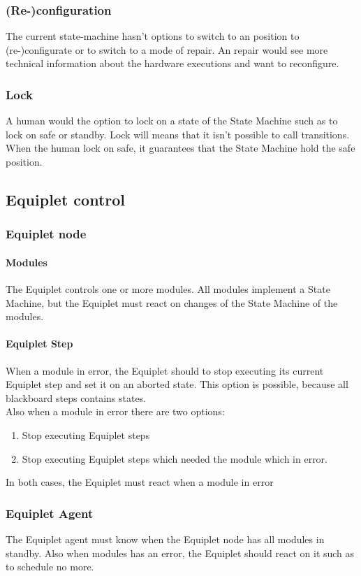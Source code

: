 \documentclass[12pt,a4paper]{report}
\begin{document}
\subsubsection{(Re-)configuration}
The current state-machine hasn't options to switch to an position to (re-)configurate or to switch to a mode of repair. An repair would see more technical information about the hardware executions and want to reconfigure.
\subsubsection{Lock}
A human would the option to lock on a state of the State Machine such as to lock on safe or standby. Lock will means that it isn't possible to call transitions. When the human lock on safe, it guarantees that the State Machine hold the safe position.

\subsection{Equiplet control}
\subsubsection{Equiplet node}
\paragraph{Modules}The Equiplet controls one or more modules. All modules implement a State Machine, but the Equiplet must react on changes of the State Machine of the modules.
\paragraph{Equiplet Step}When a module in error, the Equiplet should to stop executing its current Equiplet step and set it on an aborted state. This option is possible, because all blackboard steps contains states. 
\\Also when a module in error there are two options:
\begin{enumerate}
\item Stop executing Equiplet steps
\item Stop executing Equiplet steps which needed the module which in error.
\end{enumerate}
In both cases, the Equiplet must react when a module in error
\subsubsection{Equiplet Agent}
The Equiplet agent must know when the Equiplet node has all modules in standby. Also when modules has an error, the Equiplet should react on it such as to schedule no more.
\end{document}
